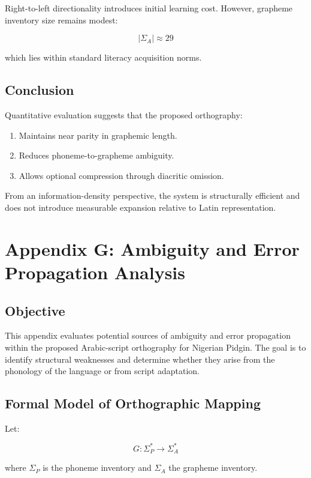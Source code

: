 \documentclass[12pt]{article}
\begin{document}
Right-to-left directionality introduces initial learning cost. However, grapheme inventory size remains modest:

\[
|\Sigma_A| \approx 29
\]

which lies within standard literacy acquisition norms.

\subsection{Conclusion}

Quantitative evaluation suggests that the proposed orthography:

\begin{enumerate}
\item Maintains near parity in graphemic length.
\item Reduces phoneme-to-grapheme ambiguity.
\item Allows optional compression through diacritic omission.
\end{enumerate}

From an information-density perspective, the system is structurally efficient and does not introduce measurable expansion relative to Latin representation.

\section{Appendix G: Ambiguity and Error Propagation Analysis}

\subsection{Objective}

This appendix evaluates potential sources of ambiguity and error propagation within the proposed Arabic-script orthography for Nigerian Pidgin. The goal is to identify structural weaknesses and determine whether they arise from the phonology of the language or from script adaptation.

\subsection{Formal Model of Orthographic Mapping}

Let:

\[
G : \Sigma_P^* \rightarrow \Sigma_A^*
\]

where \( \Sigma_P \) is the phoneme inventory and \( \Sigma_A \) the grapheme inventory.
\end{document}
